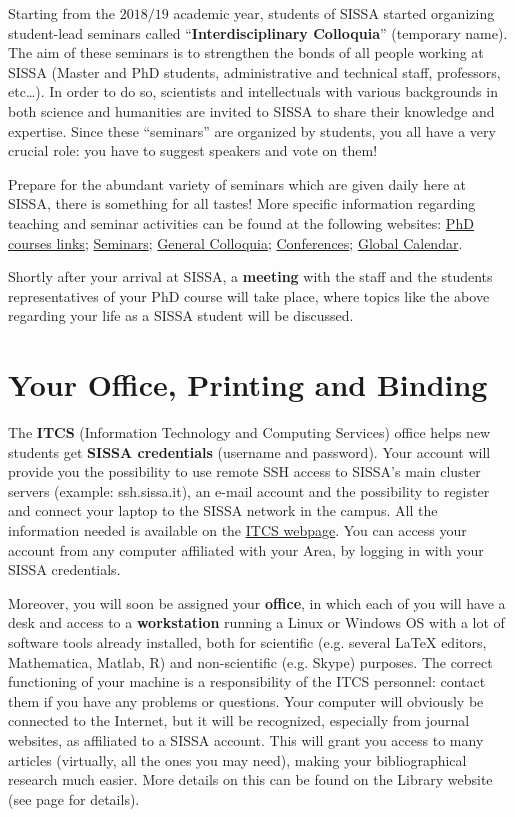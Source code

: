 \documentclass{sissavademecum}
\begin{document}
Starting from the $2018/19$ academic year, students of SISSA started organizing student-lead seminars called ``\textbf{Interdisciplinary Colloquia}'' (temporary name). The aim of these seminars is to strengthen the bonds of all people working at SISSA (Master and PhD students, administrative and technical staff, professors, etc\dots). In order to do so, scientists and intellectuals with various backgrounds in both science and humanities are invited to SISSA to share their knowledge and expertise. Since these ``seminars'' are organized by students, you all have a very crucial role: you have to suggest speakers and vote on them!

Prepare for the abundant variety of seminars which are given daily here at SISSA, there is something for all tastes! More specific information regarding teaching and seminar activities can be found at the following websites:  \href{https://www.sissa.it/phd-courses}{PhD courses links};   \href{https://www.sissa.it/calendar/event-type/seminar}{Seminars};  \href{https://www.sissa.it/news/colloquia}{General Colloquia};  \href{https://www.sissa.it/news/conferences}{Conferences}; \href{https://www.sissa.it/calendar}{Global Calendar}.


Shortly after your arrival at SISSA, a \textbf{meeting} with the staff and the students representatives of your PhD course will take place, where topics like the above regarding your life as a SISSA student will be discussed.


\section{Your Office, Printing and Binding}

The \textbf{ITCS} (Information Technology and Computing Services) office helps new students get \textbf{SISSA credentials} (username and password). Your account will provide you the possibility to use remote SSH access to SISSA's main cluster servers (example: ssh.sissa.it), an e-mail account and the possibility to register and connect your laptop to the SISSA network in the campus. All the information needed is available on the \href{https://www.itcs.sissa.it}{ITCS webpage}. You can access your account from any computer affiliated with your Area, by logging in with your SISSA credentials.

Moreover, you will soon be assigned your \textbf{office}, in which each of you will have a desk and access to a \textbf{workstation} running a Linux or Windows OS with a lot of software tools already installed, both for scientific (e.g. several LaTeX editors, Mathematica, Matlab, R) and non-scientific (e.g. Skype) purposes. The correct functioning of your machine is a responsibility of the ITCS personnel: contact them if you have any problems or questions. Your computer will obviously be connected to the Internet, but it will be recognized, especially from journal websites, as affiliated to a SISSA account. This will grant you access to many articles (virtually, all the ones you may need), making your bibliographical research much easier. More details on this can be found on the Library website (see page \pageref{sec:Library} for details).
\end{document}
